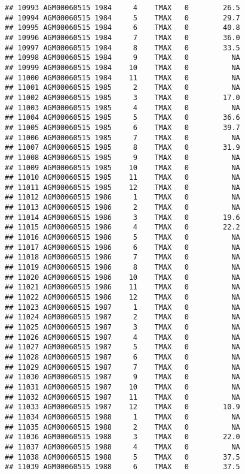 \documentclass{article}\usepackage[]{graphicx}\usepackage[]{color}
\makeatletter
\newenvironment{kframe}{%
 \def\at@end@of@kframe{}%
 \ifinner\ifhmode%
  \def\at@end@of@kframe{\end{minipage}}%
  \begin{minipage}{\columnwidth}%
 \fi\fi%
 \def\FrameCommand##1{\hskip\@totalleftmargin \hskip-\fboxsep
 \colorbox{shadecolor}{##1}\hskip-\fboxsep
     \hskip-\linewidth \hskip-\@totalleftmargin \hskip\columnwidth}%
 \MakeFramed {\advance\hsize-\width
   \@totalleftmargin\z@ \linewidth\hsize
   \@setminipage}}%
 {\par\unskip\endMakeFramed%
 \at@end@of@kframe}
\newenvironment{knitrout}{}{} %
\makeatother
\begin{document}
\begin{knitrout}
\begin{kframe}
\begin{verbatim}
## 10993 AGM00060515 1984     4    TMAX   0        26.5
## 10994 AGM00060515 1984     5    TMAX   0        29.7
## 10995 AGM00060515 1984     6    TMAX   0        40.8
## 10996 AGM00060515 1984     7    TMAX   0        36.0
## 10997 AGM00060515 1984     8    TMAX   0        33.5
## 10998 AGM00060515 1984     9    TMAX   0          NA
## 10999 AGM00060515 1984    10    TMAX   0          NA
## 11000 AGM00060515 1984    11    TMAX   0          NA
## 11001 AGM00060515 1985     2    TMAX   0          NA
## 11002 AGM00060515 1985     3    TMAX   0        17.0
## 11003 AGM00060515 1985     4    TMAX   0          NA
## 11004 AGM00060515 1985     5    TMAX   0        36.6
## 11005 AGM00060515 1985     6    TMAX   0        39.7
## 11006 AGM00060515 1985     7    TMAX   0          NA
## 11007 AGM00060515 1985     8    TMAX   0        31.9
## 11008 AGM00060515 1985     9    TMAX   0          NA
## 11009 AGM00060515 1985    10    TMAX   0          NA
## 11010 AGM00060515 1985    11    TMAX   0          NA
## 11011 AGM00060515 1985    12    TMAX   0          NA
## 11012 AGM00060515 1986     1    TMAX   0          NA
## 11013 AGM00060515 1986     2    TMAX   0          NA
## 11014 AGM00060515 1986     3    TMAX   0        19.6
## 11015 AGM00060515 1986     4    TMAX   0        22.2
## 11016 AGM00060515 1986     5    TMAX   0          NA
## 11017 AGM00060515 1986     6    TMAX   0          NA
## 11018 AGM00060515 1986     7    TMAX   0          NA
## 11019 AGM00060515 1986     8    TMAX   0          NA
## 11020 AGM00060515 1986    10    TMAX   0          NA
## 11021 AGM00060515 1986    11    TMAX   0          NA
## 11022 AGM00060515 1986    12    TMAX   0          NA
## 11023 AGM00060515 1987     1    TMAX   0          NA
## 11024 AGM00060515 1987     2    TMAX   0          NA
## 11025 AGM00060515 1987     3    TMAX   0          NA
## 11026 AGM00060515 1987     4    TMAX   0          NA
## 11027 AGM00060515 1987     5    TMAX   0          NA
## 11028 AGM00060515 1987     6    TMAX   0          NA
## 11029 AGM00060515 1987     7    TMAX   0          NA
## 11030 AGM00060515 1987     9    TMAX   0          NA
## 11031 AGM00060515 1987    10    TMAX   0          NA
## 11032 AGM00060515 1987    11    TMAX   0          NA
## 11033 AGM00060515 1987    12    TMAX   0        10.9
## 11034 AGM00060515 1988     1    TMAX   0          NA
## 11035 AGM00060515 1988     2    TMAX   0          NA
## 11036 AGM00060515 1988     3    TMAX   0        22.0
## 11037 AGM00060515 1988     4    TMAX   0          NA
## 11038 AGM00060515 1988     5    TMAX   0        37.5
## 11039 AGM00060515 1988     6    TMAX   0        37.5

\end{verbatim}
\end{kframe}
\end{knitrout}
\end{document}
